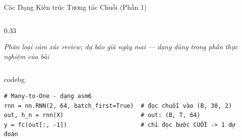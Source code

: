 \documentclass[aspectratio=169, 10pt]{beamer}
\newenvironment{codebox}{\begin{beamercolorbox}[sep=3pt, rounded=true]{codebg}\footnotesize\ttfamily}{\end{beamercolorbox}}
\begin{document}
\begin{frame}[fragile]{Các Dạng Kiến trúc Tương tác Chuỗi (Phần 1)}
\begin{columns}[T]
\begin{column}{0.33\textwidth}
\begin{center}
\vspace{0.08cm}

\vspace{0.08cm}
\footnotesize \textit{Phân loại cảm xúc review; \textcolor{emeraldgreen}{dự báo giá ngày mai — dạng dùng trong phần thực nghiệm của bài}}
\end{center}
\end{column}
\end{columns}

\vspace{0.1cm}
\begin{codebox}\begin{verbatim}
# Many-to-One - dạng asm6
rnn = nn.RNN(2, 64, batch_first=True)  # đọc chuỗi vào (B, 30, 2)
out, h_n = rnn(X)                      # out: (B, T, 64)
y = fc(out[:, -1])                     # chỉ đọc bước CUỐI -> 1 dự đoán
\end{verbatim}\end{codebox}
\end{frame}
\end{document}
